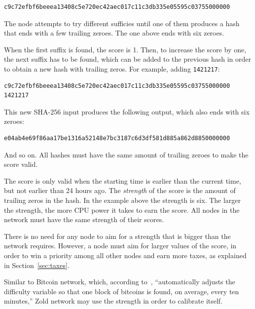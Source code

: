 \documentclass[11pt,oneside]{article}
\newcommand\dd[1]{\colorbox{gray!30}{\texttt{#1}}}
\begin{document}
\begin{verbatim}
c9c72efbf6beeea13408c5e720ec42aec017c11c3db335e05595c03755000000
\end{verbatim}

The node attempts to try different sufficies until one of them produces
a hash that ends with a few trailing zeroes. The one above ends
with six zeroes.

When the first suffix is found, the score is 1. Then, to
increase the score by one, the next suffix has to be found, which
can be added to the previous hash
in order to obtain a new hash with trailing zeros. For example,
adding \dd{1421217}:

\begin{verbatim}
c9c72efbf6beeea13408c5e720ec42aec017c11c3db335e05595c03755000000 1421217
\end{verbatim}

This new SHA-256 input produces the following output, which also
ends with six zeroes:

\begin{verbatim}
e04ab4e69f86aa17be1316a52148e7bc3187c6d3df581d885a862d8850000000
\end{verbatim}

And so on. All hashes must have the same amount of trailing zeroes to make
the score valid.

The score is only valid when the starting time is earlier than
the current time, but not earlier than 24 hours ago. The \emph{strength} of the score
is the amount of trailing zeros in the hash. In the example above the
strength is six. The larger the strength, the more CPU power it takes to earn
the score. All nodes in the network must have the same strength of their scores.

There is no need for any node to aim for a strength that is bigger than the network requires.
However, a node must aim for larger values of the score, in order
to win a priority among all other nodes and earn more taxes,
as explained in Section~\ref{sec:taxes}.

Similar to Bitcoin network, which, according to~\textcite{hayes2017},
``automatically adjusts the difficulty
variable so that one block of bitcoins is found, on average, every ten minutes,''
Zold network may use the strength in order to calibrate itself.

\end{document}
